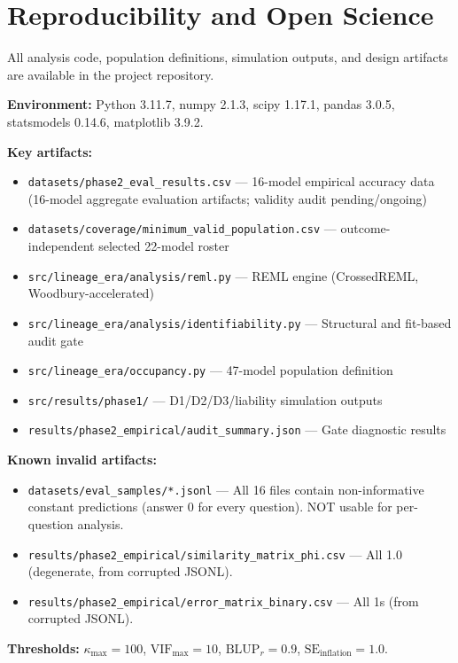 \documentclass{ieeeaccess}
\theoremstyle{definition}
\theoremstyle{plain}
\begin{document}
\section{Reproducibility and Open Science}
\label{sec:repro}

All analysis code, population definitions, simulation outputs, and design artifacts are available in the project repository.

\textbf{Environment:} Python 3.11.7, numpy 2.1.3, scipy 1.17.1, pandas 3.0.5, statsmodels 0.14.6, matplotlib 3.9.2.

\textbf{Key artifacts:}
\begin{itemize}
\item \texttt{datasets/phase2\_eval\_results.csv} --- 16-model empirical accuracy data (16-model aggregate evaluation artifacts; validity audit pending/ongoing)
\item \texttt{datasets/coverage/minimum\_valid\_population.csv} --- outcome-independent selected 22-model roster
\item \texttt{src/lineage\_era/analysis/reml.py} --- REML engine (CrossedREML, Woodbury-accelerated)
\item \texttt{src/lineage\_era/analysis/identifiability.py} --- Structural and fit-based audit gate
\item \texttt{src/lineage\_era/occupancy.py} --- 47-model population definition
\item \texttt{src/results/phase1/} --- D1/D2/D3/liability simulation outputs
\item \texttt{results/phase2\_empirical/audit\_summary.json} --- Gate diagnostic results
\end{itemize}

\textbf{Known invalid artifacts:}
\begin{itemize}
\item \texttt{datasets/eval\_samples/*.jsonl} --- All 16 files contain non-informative constant predictions (answer 0 for every question). NOT usable for per-question analysis.
\item \texttt{results/phase2\_empirical/similarity\_matrix\_phi.csv} --- All 1.0 (degenerate, from corrupted JSONL).
\item \texttt{results/phase2\_empirical/error\_matrix\_binary.csv} --- All 1s (from corrupted JSONL).
\end{itemize}

\textbf{Thresholds:} $\kappa_{\max} = 100$, $\text{VIF}_{\max} = 10$, $\text{BLUP}_{r} = 0.9$, $\text{SE}_{\text{inflation}} = 1.0$.
\end{document}
